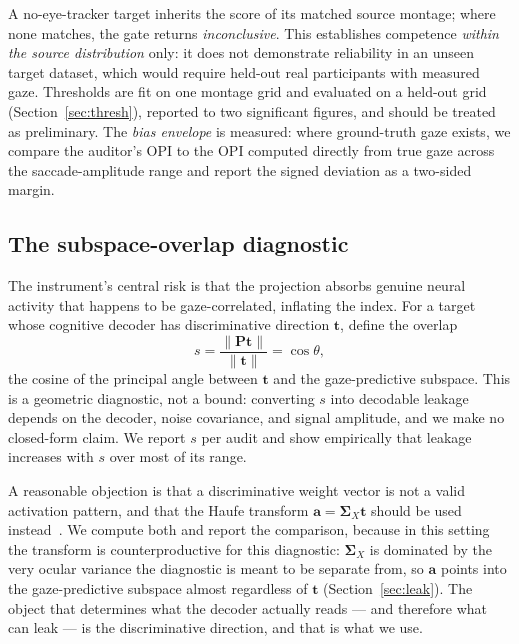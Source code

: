 \documentclass[conference]{IEEEtran}
\begin{document}
A no-eye-tracker target inherits the score of its matched source montage; where none matches, the
gate returns \emph{inconclusive}. This establishes competence \emph{within the source
distribution} only: it does not demonstrate reliability in an unseen target dataset, which would
require held-out real participants with measured gaze. Thresholds are fit on one montage grid and
evaluated on a held-out grid (Section~\ref{sec:thresh}), reported to two significant figures, and
should be treated as preliminary. The \emph{bias envelope} is measured: where ground-truth gaze
exists, we compare the auditor's OPI to the OPI computed directly from true gaze across the
saccade-amplitude range and report the signed deviation as a two-sided margin.

\subsection{The subspace-overlap diagnostic}

The instrument's central risk is that the projection absorbs genuine neural activity that
happens to be gaze-correlated, inflating the index. For a target whose cognitive decoder has
discriminative direction $\mathbf{t}$, define the overlap
\begin{equation}
s=\frac{\lVert\mathbf{P}\mathbf{t}\rVert}{\lVert\mathbf{t}\rVert}=\cos\theta,
\label{eq:overlap}
\end{equation}
the cosine of the principal angle between $\mathbf{t}$ and the gaze-predictive subspace. This is
a geometric diagnostic, not a bound: converting $s$ into decodable leakage depends on the
decoder, noise covariance, and signal amplitude, and we make no closed-form claim. We report $s$
per audit and show empirically that leakage increases with $s$ over most of its range.

A reasonable objection is that a discriminative weight vector is not a valid activation pattern,
and that the Haufe transform $\mathbf{a}=\boldsymbol{\Sigma}_{\!X}\mathbf{t}$ should be used
instead~\cite{haufe2014interpretation}. We compute both and report the comparison, because in
this setting the transform is counterproductive for this diagnostic: $\boldsymbol{\Sigma}_{\!X}$ is
dominated by the very ocular variance the diagnostic is meant to be separate from, so
$\mathbf{a}$ points into the gaze-predictive subspace almost regardless of $\mathbf{t}$
(Section~\ref{sec:leak}). The object that determines what the decoder actually reads --- and
therefore what can leak --- is the discriminative direction, and that is what we use.
\end{document}
